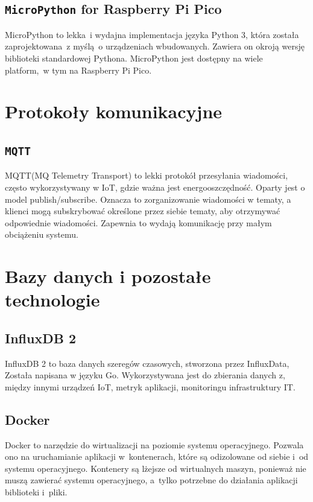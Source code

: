 \subsection{\texttt{MicroPython} for Raspberry Pi Pico}
MicroPython to lekka~i wydajna implementacja języka Python 3, która została zaprojektowana~z myślą~o urządzeniach wbudowanych. Zawiera on okroją wersję biblioteki standardowej Pythona. MicroPython jest dostępny na wiele platform,~w tym na Raspberry Pi Pico.~\cite{PICO:micropython}

\section{Protokoły komunikacyjne}

\subsection{\texttt{MQTT}}
MQTT(MQ Telemetry Transport) to lekki protokół przesyłania wiadomości, często wykorzystywany w IoT, gdzie ważna jest energooszczędność. Oparty jest o model publish/subscribe. Oznacza to zorganizowanie wiadomości w tematy, a klienci mogą subskrybować określone przez siebie tematy, aby otrzymywać odpowiednie wiadomości. Zapewnia to wydają komunikację przy małym obciążeniu systemu.~\cite{protocol:mqtt}

\section{Bazy danych i pozostałe technologie}
\subsection{InfluxDB 2}
InfluxDB 2 to baza danych szeregów czasowych, stworzona przez InfluxData, Została napisana w języku Go. Wykorzystywana jest do zbierania danych z, między innymi urządzeń IoT, metryk aplikacji, monitoringu infrastruktury IT.~\cite{tool:influxdb}

\subsection{Docker}
Docker to narzędzie do wirtualizacji na poziomie systemu operacyjnego. Pozwala ono na uruchamianie aplikacji w~kontenerach, które są odizolowane od siebie i~od systemu operacyjnego. Kontenery są lżejsze od wirtualnych maszyn, ponieważ nie muszą zawierać systemu operacyjnego, a~tylko potrzebne do działania aplikacji biblioteki i~pliki.~\cite{tool:docker}

